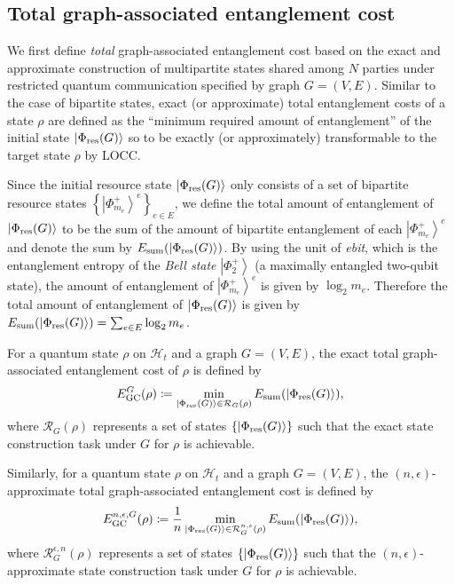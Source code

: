 \documentclass[preprintnumbers,aps,amsmath,amssymb,pra,twocolumn,showpacs,superscriptaddress,floatfix]{revtex4-1}
\def\Ket#1{\left|#1\right\rangle}
\theoremstyle{plain}
\theoremstyle{definition}
\theoremstyle{remark}
\begin{document}
\subsection{Total graph-associated entanglement cost}

We first define \textit{total} graph-associated entanglement cost based on the exact and approximate construction of multipartite states shared among $N$ parties under restricted quantum communication specified by graph $G=(V,E)$.   Similar to the case of bipartite states, exact (or approximate) total entanglement costs of a state $\rho$ are defined as the ``minimum required amount of entanglement'' of the initial state $\Ket{\Phi_{\textup{res}} (G)}$ so to be exactly (or approximately) transformable to the target state $\rho$ by LOCC\@.  

Since the initial resource state $\Ket{\Phi_{\textup{res}} (G)}$ only consists of a set of bipartite resource states ${\left\{ \Ket{\Phi_{m_e}^+}^e \right\}}_{e\in E}$, we define the total amount of entanglement of  $\Ket{\Phi_{\textup{res}} (G)}$ to be the sum of the amount of bipartite entanglement of each $\Ket{\Phi_{m_e}^+}^e$ and denote the sum by $E_\textup{sum} (\Ket{\Phi_{\textup{res}} (G)})$.   By using the unit of \textit{ebit}, which is the entanglement entropy of the \textit{Bell state} $\Ket{\Phi_{2}^+}$ (a maximally entangled two-qubit state), the amount of entanglement of $\Ket{\Phi_{m_e}^+}^e$ is given by $\log_2 m_e$.    Therefore the total amount of entanglement of $\Ket{\Phi_{\textup{res}} (G)}$ is given by $E_\textup{sum} (\Ket{\Phi_{\textup{res}} (G)}) =\sum_{e \in E} \log_2 m_e$.

For a quantum state $\rho$ on $\mathcal{H}_t$ and a graph $G=(V,E)$, the exact total graph-associated entanglement cost of $\rho$ is defined by
\begin{align*}
E_{\textup{GC}}^G (\rho) \coloneqq \min_{\Ket{\Phi_{\textup{res}} (G)} \in \mathcal{R}_G (\rho)} E_\textup{sum} (\Ket{\Phi_{\textup{res}} (G)}),
\end{align*}
where $\mathcal{R}_G (\rho)$ represents a set of states $\{ \Ket{\Phi_{\textup{res}} (G)} \}$ such that the exact state construction task under $G$ for $\rho$ is achievable. 

Similarly, for a quantum state $\rho$ on $\mathcal{H}_t$ and a graph $G=(V,E)$, the $(n, \epsilon)$-approximate total graph-associated entanglement cost is defined by 
\begin{align*}
E_{\textup{GC}}^{n, \epsilon,G} (\rho) \coloneqq \frac{1}{n} \min_{\Ket{\Phi_{\textup{res}} (G)} \in \mathcal{R}^{n,\epsilon}_G (\rho)} E_\textup{sum} (\Ket{\Phi_{\textup{res}} (G)}),
\end{align*}
where $\mathcal{R}^{\epsilon, n}_G (\rho)$ represents a set of states $\{ \Ket{\Phi_{\textup{res}} (G)} \}$ such that the $(n, \epsilon)$-approximate state construction task under $G$ for $\rho$ is achievable. 
\end{document}
